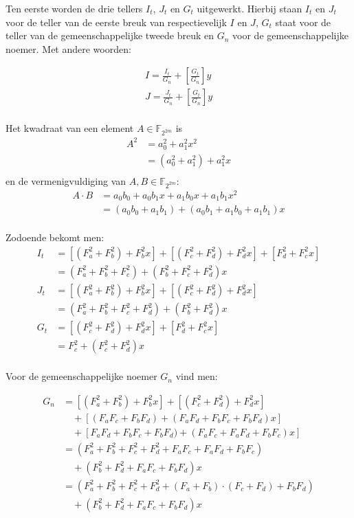 Ten eerste worden de drie tellers $I_t$, $J_t$ en $G_t$ uitgewerkt. Hierbij staan $I_t$ en $J_t$ voor de teller van de eerste breuk van respectievelijk $I$ en $J$, $G_t$ staat voor de teller van de gemeenschappelijke tweede breuk en $G_n$ voor de gemeenschappelijke noemer. Met andere woorden:

\[\begin{aligned}
I = \frac{I_t}{G_n} + \left[ \frac{G_t}{G_n} \right] y\\
J = \frac{J_t}{G_n} + \left[ \frac{G_t}{G_n} \right] y\\
\end{aligned}\]

Het kwadraat van een element $A \in \mathbb{F}_{2^{2m}}$ is
\[\begin{aligned}
A^2	&= a_0^2 + a_1^2 x^2\\
		&= (a_0^2 + a_1^2) + a_1^2 x\\
\end{aligned}\]
en de vermenigvuldiging van $A, B \in \mathbb{F}_{2^{2m}}$:
\[\begin{aligned}
A \cdot B	&= a_0 b_0 + a_0 b_1 x + a_1 b_0 x + a_1 b_1 x^2\\
				&= (a_0 b_0 + a_1 b_1) + (a_0 b_1 + a_1 b_0 + a_1 b_1)x\\
\end{aligned}\]

Zodoende bekomt men:
\[\begin{aligned}
I_t	&= [(F_a^2 + F_b^2) + F_b^2 x] + [(F_c^2 + F_d^2) + F_d^2x] + [F_d^2 + F_c^2x]\\
		&= (F_a^2 + F_b^2 + F_c^2) + (F_b^2 + F_c^2 + F_d^2)x\\
J_t	&= [(F_a^2 + F_b^2) + F_b^2 x] + [(F_c^2 + F_d^2) + F_d^2x]\\
		&= (F_a^2 + F_b^2 + F_c^2 + F_d^2) + (F_b^2 + F_d^2)x\\
G_t	&= [(F_c^2 + F_d^2) + F_d^2x] + [F_d^2 + F_c^2x]\\
		&= F_c^2 + (F_c^2 + F_d^2)x\\
\end{aligned}\]

Voor de gemeenschappelijke noemer $G_n$ vind men:

\[\begin{aligned}
G_n	&= [(F_a^2 + F_b^2) + F_b^2 x] + [(F_c^2 + F_d^2) + F_d^2x]\\
			&\quad + [(F_a F_c + F_b F_d) + (F_a F_d + F_b F_c + F_b F_d)x]\\
			&\quad + [F_a F_d + F_b F_c + F_b F_d) + (F_a F_c + F_a F_d + F_b F_c)x]\\
		&= (F_a^2 + F_b^2 + F_c^2 + F_d^2 + F_a F_c + F_a F_d + F_b F_c)\\
			&\quad + (F_b^2 + F_d^2 + F_a F_c + F_b F_d)x\\
		&= (F_a^2 + F_b^2 + F_c^2 + F_d^2 + (F_a + F_b) \cdot (F_c + F_d) + F_b F_d)\\
			&\quad + (F_b^2 + F_d^2 + F_a F_c + F_b F_d)x\\
\end{aligned}\]

